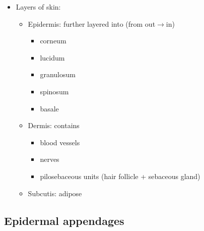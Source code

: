 \documentclass[
  12pt,
]{memoir}
\providecommand{\tightlist}{%
  \setlength{\itemsep}{0pt}\setlength{\parskip}{0pt}}
\begin{document}
\begin{itemize}
\tightlist
\item
  Layers of skin:

  \begin{itemize}
  \tightlist
  \item
    Epidermis: further layered into (from out\(\rightarrow\)in)

    \begin{itemize}
    \tightlist
    \item
      corneum
    \item
      lucidum
    \item
      granulosum
    \item
      spinosum
    \item
      basale
    \end{itemize}
  \item
    Dermis: contains

    \begin{itemize}
    \tightlist
    \item
      blood vessels
    \item
      nerves
    \item
      pilosebaceous units (hair follicle + sebaceous gland)
    \end{itemize}
  \item
    Subcutis: adipose
  \end{itemize}
\end{itemize}

\hypertarget{epidermal-appendages}{%
\subsection{Epidermal appendages}\label{epidermal-appendages}}
\end{document}
